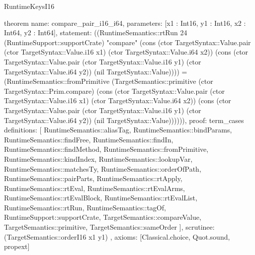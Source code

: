 \begin{lexlean}{RuntimeKeysI16}
\begin{semanticmodule}
theorem{
  name: compare_pair_i16_i64,
  parameters: [x1 : Int16, y1 : Int16, x2 : Int64, y2 : Int64],
  statement: ((RuntimeSemantics::rtRun 24 (RuntimeSupport::supportCrate) "compare" (cons (ctor TargetSyntax::Value.pair (ctor TargetSyntax::Value.i16 x1) (ctor TargetSyntax::Value.i64 x2)) (cons (ctor TargetSyntax::Value.pair (ctor TargetSyntax::Value.i16 y1) (ctor TargetSyntax::Value.i64 y2)) (nil TargetSyntax::Value)))) = (RuntimeSemantics::fromPrimitive (TargetSemantics::primitive (ctor TargetSyntax::Prim.compare) (cons (ctor TargetSyntax::Value.pair (ctor TargetSyntax::Value.i16 x1) (ctor TargetSyntax::Value.i64 x2)) (cons (ctor TargetSyntax::Value.pair (ctor TargetSyntax::Value.i16 y1) (ctor TargetSyntax::Value.i64 y2)) (nil TargetSyntax::Value)))))),
  proof: term_cases{
    definitions: [
      RuntimeSemantics::aliasTag,
      RuntimeSemantics::bindParams,
      RuntimeSemantics::findFree,
      RuntimeSemantics::findIn,
      RuntimeSemantics::findMethod,
      RuntimeSemantics::fromPrimitive,
      RuntimeSemantics::kindIndex,
      RuntimeSemantics::lookupVar,
      RuntimeSemantics::matchesTy,
      RuntimeSemantics::orderOfPath,
      RuntimeSemantics::pairParts,
      RuntimeSemantics::rtApply,
      RuntimeSemantics::rtEval,
      RuntimeSemantics::rtEvalArms,
      RuntimeSemantics::rtEvalBlock,
      RuntimeSemantics::rtEvalList,
      RuntimeSemantics::rtRun,
      RuntimeSemantics::tagOf,
      RuntimeSupport::supportCrate,
      TargetSemantics::compareValue,
      TargetSemantics::primitive,
      TargetSemantics::sameOrder
    ],
    scrutinee: (TargetSemantics::orderI16 x1 y1)
  },
  axioms: [Classical.choice, Quot.sound, propext]
}
\end{semanticmodule}
\end{lexlean}
